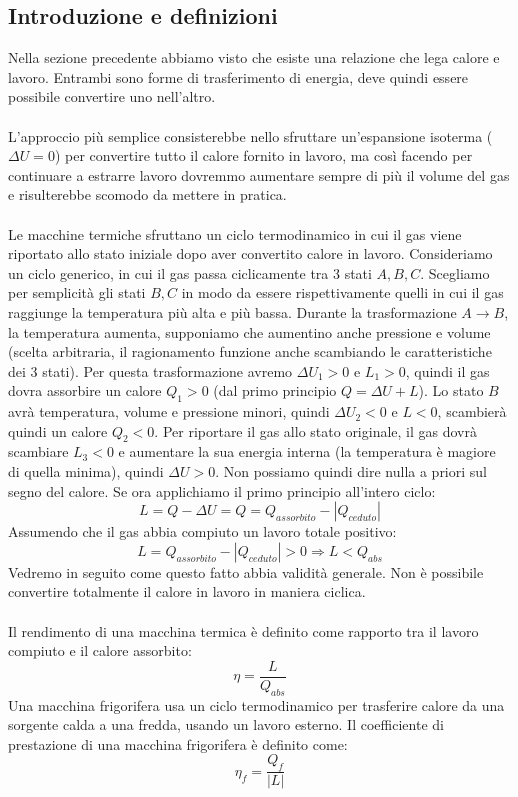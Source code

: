 \documentclass{article}
\begin{document}
\subsection{Introduzione e definizioni}
Nella sezione precedente abbiamo visto che esiste una relazione che lega calore e lavoro. Entrambi sono forme di trasferimento di energia, deve quindi essere possibile convertire uno nell'altro.\\\\
L'approccio più semplice consisterebbe nello sfruttare un'espansione isoterma ($\Delta U=0$) per convertire tutto il calore fornito in lavoro, ma così facendo per continuare a estrarre lavoro dovremmo aumentare sempre di più il volume del gas e risulterebbe scomodo da mettere in pratica.\\\\
Le macchine termiche sfruttano un ciclo termodinamico in cui il gas viene riportato allo stato iniziale dopo aver convertito calore in lavoro.
Consideriamo un ciclo generico, in cui il gas passa ciclicamente tra 3 stati $A,B,C$. Scegliamo per semplicità gli stati $B,C$ in modo da essere rispettivamente quelli in cui il gas raggiunge la temperatura più alta e più bassa. Durante la trasformazione $A\rightarrow B$, la temperatura aumenta, supponiamo che aumentino anche pressione e volume (scelta arbitraria, il ragionamento funzione anche scambiando le caratteristiche dei 3 stati). Per questa trasformazione avremo $\Delta U_1>0$ e $L_1>0$, quindi il gas dovra assorbire un calore $Q_1>0$ (dal primo principio $Q=\Delta U + L$). Lo stato $B$ avrà temperatura, volume e pressione minori, quindi $\Delta U_2<0$ e $L<0$, scambierà quindi un calore $Q_2<0$. Per riportare il gas allo stato originale, il gas dovrà scambiare $L_3<0$ e aumentare la sua energia interna (la temperatura è magiore di quella minima), quindi $\Delta U >0$. Non possiamo quindi dire nulla a priori sul segno del calore. Se ora applichiamo il primo principio all'intero ciclo:
$$ L = Q - \Delta U = Q = Q_{assorbito} - |Q_{ceduto}| $$
Assumendo che il gas abbia compiuto un lavoro totale positivo:
$$ L = Q_{assorbito} - |Q_{ceduto}| > 0\Rightarrow L < Q_{abs}$$
Vedremo in seguito come questo fatto abbia validità generale. Non è possibile convertire totalmente il calore in lavoro in maniera ciclica.\\\\
Il rendimento di una macchina termica è definito come rapporto tra il lavoro compiuto e il calore assorbito:
$$ \eta=\frac{L}{Q_{abs}} $$
Una macchina frigorifera usa un ciclo termodinamico per trasferire calore da una sorgente calda a una fredda, usando un lavoro esterno. Il coefficiente di prestazione di una macchina frigorifera è definito come:
$$ \eta_f = \frac{Q_f}{|L|} $$
\end{document}

